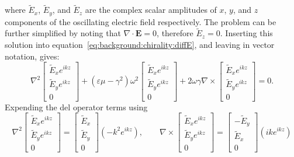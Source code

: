 where $\tilde E_x$, $\tilde E_y$, and $\tilde E_z$ are the complex scalar amplitudes of $x$, $y$, and $z$ components of the oscillating electric field respectively. The problem can be further simplified by noting that $\nabla \cdot \mathbf{E} = 0$, therefore $\tilde E_z = 0$. Inserting this solution into equation~\ref{eq:background:chirality:diffE}, and leaving in vector notation, gives:
\begin{equation}\label{eq:background:chirality:diffEvec}
    \nabla^2 \begin{bmatrix}\tilde E_x e^{i k z}\\ \tilde E_y e^{i k z} \\0 \end{bmatrix}+ (\varepsilon \mu - \gamma^2)\omega^2 \begin{bmatrix}\tilde E_x e^{i k z}\\ \tilde E_y e^{i k z} \\0 \end{bmatrix} + 2 \omega \gamma \nabla \times \begin{bmatrix}\tilde E_x e^{i k z}\\ \tilde E_y e^{i k z} \\0 \end{bmatrix} = 0.
\end{equation}
Expending the del operator terms using
\begin{equation}
    \nabla^2 
    \begin{bmatrix}
        \tilde E_x e^{i k z}\\ 
        \tilde E_y e^{i k z} \\
        0 
    \end{bmatrix} 
    = 
    \begin{bmatrix} 
        \tilde E_x \\ 
        \tilde E_y \\ 
        0 
    \end{bmatrix} 
    (-k^2 e^{i k z}), \qquad
    \nabla \times
    \begin{bmatrix}
        \tilde E_x e^{i k z}\\ 
        \tilde E_y e^{i k z} \\
        0 
    \end{bmatrix} 
    = 
    \begin{bmatrix} 
        -\tilde E_y \\ 
        \tilde E_x \\ 
        0 
    \end{bmatrix} 
    (i k e^{i k z}) 
\end{equation}
